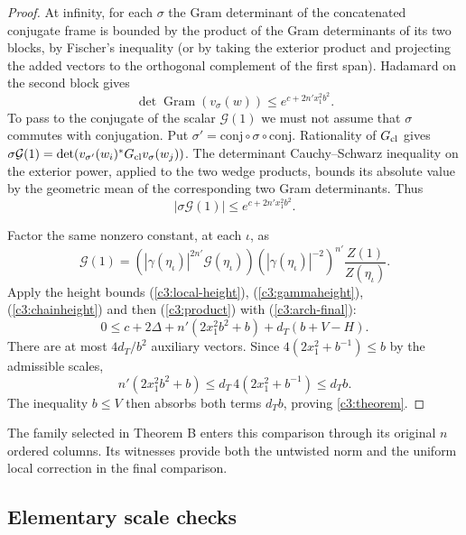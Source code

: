 \begin{proof}
At infinity, for each $\sigma$ the Gram determinant of the
concatenated conjugate frame is bounded by the product of the
Gram determinants of its two blocks, by Fischer's inequality
(or by taking the exterior product and projecting the added
vectors to the orthogonal complement of the first span).
Hadamard on the second block gives
\[
 \det\operatorname{Gram}(v_\sigma(w))\le
 e^{c+2n'x_1^2b^2}.
\]
To pass to the conjugate of the scalar $\mathcal G(1)$ we must not
assume that $\sigma$ commutes with conjugation. Put
$\sigma'=\mathrm{conj}\circ\sigma\circ\mathrm{conj}$.
Rationality of $G_{\rm cl}$ gives
$\sigma\mathcal G(1)=\det(v_{\sigma'}(w_i)^*G_{\rm cl} v_\sigma(w_j))$.
The determinant Cauchy--Schwarz inequality on the exterior power,
applied to the two wedge products, bounds its absolute value by
the geometric mean of the corresponding two Gram determinants.
Thus
\begin{equation}\label{c3:arch-final}
 |\sigma\mathcal G(1)|\le e^{c+2n'x_1^2b^2}.
\end{equation}

Factor the same nonzero constant, at each $\iota$, as
\[
 \mathcal G(1)=
 (|\gamma(\eta_\iota)|^{2n'}\mathcal G(\eta_\iota))
 (|\gamma(\eta_\iota)|^{-2})^{n'}
 \frac{Z(1)}{Z(\eta_\iota)} .
\]
Apply the height bounds (\ref{c3:local-height}),
(\ref{c3:gammaheight}), (\ref{c3:chainheight}) and then
(\ref{c3:product}) with (\ref{c3:arch-final}):
\[
 0\le c+2\Delta+n'(2x_1^2b^2+b)+d_T(b+V-H).
\]
There are at most $4d_T/b^2$ auxiliary vectors. Since
$4(2x_1^2+b^{-1})\le b$ by the admissible scales,
\[
 n'(2x_1^2b^2+b)\le d_T\,4(2x_1^2+b^{-1})\le d_T b .
\]
The inequality $b\le V$ then absorbs both terms $d_T b$, proving
\eqref{c3:theorem}.
\end{proof}

The family selected in Theorem B enters this comparison through
its original $n$ ordered columns. Its witnesses provide both the
untwisted norm and the uniform local correction in the final
comparison.

\subsection{Elementary scale checks}\label{c3:scales}

